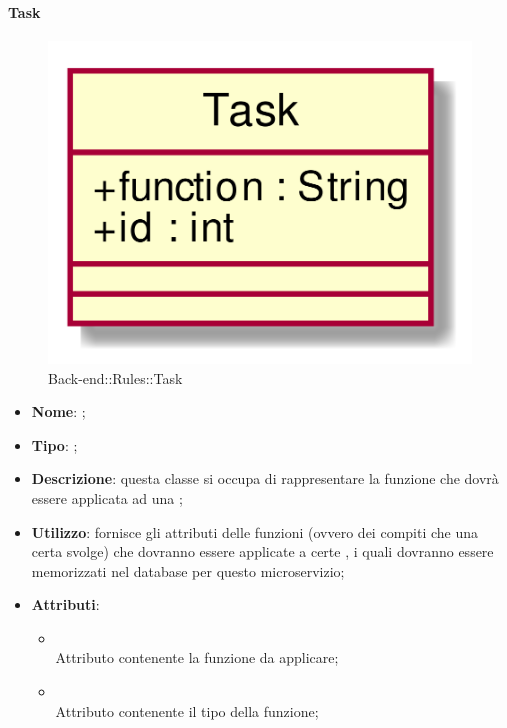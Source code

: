 \hypertarget{Task_label}{\paragraph{Task}}
\begin{figure}[h]
	\centering
	\includegraphics[width=\textwidth,height=\textheight,keepaspectratio]{images/ClassTask.png}
	\caption{Back-end::Rules::Task}
\end{figure}
\begin{itemize}
	\item \textbf{Nome}: ;
	\item \textbf{Tipo}: ;
	\item \textbf{Descrizione}: questa classe si occupa di rappresentare la funzione che dovrà essere applicata ad una ;
	\item \textbf{Utilizzo}: fornisce gli attributi delle funzioni (ovvero dei compiti che una certa  svolge) che dovranno essere applicate a certe , i quali dovranno essere memorizzati nel database per questo microservizio;
	\item \textbf{Attributi}:
	\begin{itemize}
		\item[]  \\
		Attributo contenente la funzione da applicare;
		\item[]  \\
		Attributo contenente il tipo della funzione;
	\end{itemize}
\end{itemize}
\FloatBarrier

